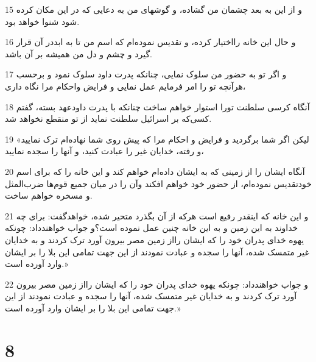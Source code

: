 \par 15 و از این به بعد چشمان من گشاده، و گوشهای من به دعایی که در این مکان کرده شود شنوا خواهد بود.
\par 16 و حال این خانه رااختیار کرده، و تقدیس نموده‌ام که اسم من تا به ابددر آن قرار گیرد و چشم و دل من همیشه بر آن باشد.
\par 17 و اگر تو به حضور من سلوک نمایی، چنانکه پدرت داود سلوک نمود و برحسب هرآنچه تو را امر فرمایم عمل نمایی و فرایض واحکام مرا نگاه داری،
\par 18 آنگاه کرسی سلطنت تورا استوار خواهم ساخت چنانکه با پدرت داودعهد بسته، گفتم کسی‌که بر اسرائیل سلطنت نماید از تو منقطع نخواهد شد.
\par 19 «لیکن اگر شما برگردید و فرایض و احکام مرا که پیش روی شما نهاده‌ام ترک نمایید و رفته، خدایان غیر را عبادت کنید، و آنها را سجده نمایید،
\par 20 آنگاه ایشان را از زمینی که به ایشان داده‌ام خواهم کند و این خانه را که برای اسم خودتقدیس نموده‌ام، از حضور خود خواهم افکند وآن را در میان جمیع قوم‌ها ضرب‌المثل و مسخره خواهم ساخت.
\par 21 و این خانه که اینقدر رفیع است هرکه از آن بگذرد متحیر شده، خواهدگفت: برای چه خداوند به این زمین و به این خانه چنین عمل نموده است؟و جواب خواهندداد: چونکه یهوه خدای پدران خود را که ایشان رااز زمین مصر بیرون آورد ترک کردند و به خدایان غیر متمسک شده، آنها را سجده و عبادت نمودند از این جهت تمامی این بلا را بر ایشان وارد آورده است.»
\par 22 و جواب خواهندداد: چونکه یهوه خدای پدران خود را که ایشان رااز زمین مصر بیرون آورد ترک کردند و به خدایان غیر متمسک شده، آنها را سجده و عبادت نمودند از این جهت تمامی این بلا را بر ایشان وارد آورده است.»
 
\chapter{8}

